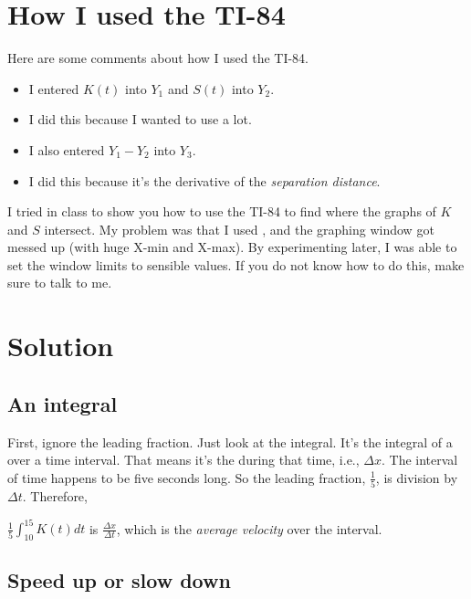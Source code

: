 \documentclass[12pt,letterpaper]{memoir}
\begin{document}
\section{How I used the TI-84} 

Here are some comments about how I used the TI-84.
\begin{itemize}[nosep]
    \item I entered $K(t)$ into $Y_1$ and $S(t)$ into $Y_2$.
    \item I did this because I wanted to use {\ttfamily[vars]} {\ttfamily[Y-vars]} {\ttfamily[Function]} a lot.
    \item I also entered $Y_1-Y_2$ into $Y_3$.
    \item I did this because it's the derivative of the {\itshape separation distance}.
\end{itemize}

I tried in class to show you how to use the TI-84 to find where 
the graphs of $K$ and $S$ intersect.
My problem was that I used {\ttfamily [ZoomFit]},
and the graphing window got messed up (with huge {\ttfamily X-min} and {\ttfamily X-max}).
By experimenting later, I was able to set the window limits to sensible values.
If you do not know how to do this, make sure to talk to me.





\section{Solution}

\subsection{An integral}

First, ignore the leading fraction. Just look at the integral.
It's the integral of a  over a time interval.
That means it's the  during that time, i.e., $\Delta x$.
The interval of time happens to be five seconds long. 
So the leading fraction, $\frac{1}{5}$, is division by $\Delta t$. 
Therefore,

\begin{tcolorbox}[colback=white]
    $\frac{1}{5}  \int_{10}^{15}K(t)dt$ \! is $\frac{\Delta x}{\Delta t}$, 
    which is the {\itshape average velocity} over the interval.
\end{tcolorbox}



\subsection{Speed up or slow down}
\end{document}
